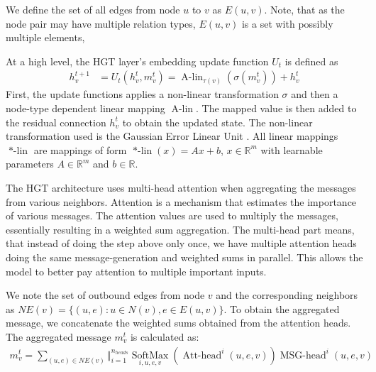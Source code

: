 \documentclass[english, 12pt, a4paper, sci, utf8, a-2b, online]{aaltothesis}
\newcommand{\R}{\mathbb{R}}
\newcommand{\Alin}{\operatorname{A-lin}}
\newcommand{\msg}{\operatorname{Msg}}
\newcommand{\att}{\operatorname{Att}}
\newcommand{\agg}{\operatorname{Aggregate}}
\begin{document}
We define the set of all edges from node $u$ to $v$ as $E(u, v)$. Note, that as the node pair may have multiple relation types, $E(u,v)$ is a set with possibly multiple elements,

At a high level, the HGT layer's embedding update function $U_t$ is defined as
\begin{align}
    h^{t+1}_v &= U_t(h_v^t, m_v^t) = \Alin_{\tau(v)}(\sigma(m_v^t))+h_v^t
\end{align}
First, the update functions applies a non-linear transformation $\sigma$ and then a node-type dependent linear mapping $\Alin$. The mapped value is then added to the residual connection $h_v^t$ to obtain the updated state. The non-linear transformation used is the Gaussian Error Linear Unit \cite{gelus}. All linear mappings $\operatorname{*-lin}$ are mappings of form $\operatorname{*-lin}(x) = Ax + b$, $x \in \R^m$ with learnable parameters $A \in \R^m$ and $b \in \R$.

The HGT architecture uses multi-head attention when aggregating the messages from various neighbors. Attention is a mechanism that estimates the importance of various messages. The attention values are used to multiply the messages, essentially resulting in a weighted sum aggregation. The multi-head part means, that instead of doing the step above only once, we have multiple attention heads doing the same message-generation and weighted sums in parallel. This allows the model to better pay attention to multiple important inputs.

We note the set of outbound edges from node $v$ and the corresponding neighbors as $NE(v) = \{(u, e) : u \in N(v), e \in E(u, v)\}$. To obtain the aggregated message, we concatenate the weighted sums obtained from the attention heads. The aggregated message $m_v^t$ is calculated as:
\begin{align*}
    m_v^t = \sum_{(u, e) \in \mathit{NE}(v)} \operatorname{\Big\Vert}_{i = 1}^{n_{\mathit{heads}}} \underset{i, u, e, v}{\operatorname{SoftMax}}(\operatorname{Att-head}^i(u, e, v))\operatorname{MSG-head}^i(u, e, v)
\end{align*}  %
\end{document}
